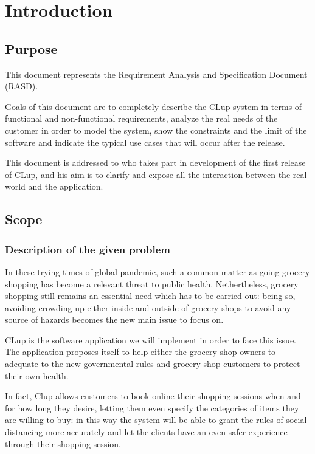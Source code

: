 \section{Introduction}
\label{sect:introduction}

\subsection{Purpose}
\label{subsect:purpose}

This document represents the Requirement Analysis and Specification Document (RASD). 

Goals of this document are to completely describe the CLup system in terms of functional and non-functional requirements, analyze the real needs of the customer in order to model the system, show the constraints and the limit of the software and indicate the typical use cases that will occur after the release. 

This document is addressed to who takes part in development of the first release of CLup, and his aim is to clarify and expose all the interaction between the real world and the application.

\subsection{Scope}
\label{subsect:scope}

\subsubsection{Description of the given problem}
\label{subsect:descriptionofthegivenproblem}

In these trying times of global pandemic, such a common matter as going grocery shopping has become a relevant threat to public health. 
Nethertheless, grocery shopping still remains an essential need which has to be carried out: being so, avoiding crowding up either inside and outside of grocery shops to avoid any source of hazards becomes the new main issue to focus on.

CLup is the software application we will implement in order to face this issue. The application proposes itself to help either the grocery shop owners to adequate to the new governmental rules and grocery shop customers to protect their own health.

In fact, Clup allows customers to book online their shopping sessions when and for how long they desire, letting them even specify the categories of items they are willing to buy: in this way the system will be able to grant the rules of social distancing more accurately and let the clients have an even safer experience through their shopping session.

